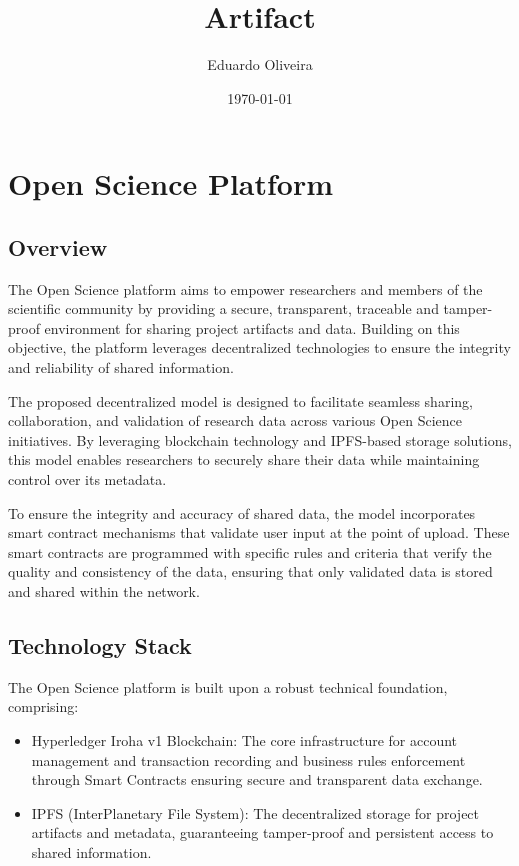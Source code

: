 \documentclass{article}
\title{Artifact}
\author{Eduardo Oliveira}
\date{\today}
\begin{document}
\maketitle

\section{Open Science Platform}

\subsection{Overview}

The Open Science platform aims to empower researchers and members of the scientific community by providing a secure, transparent, traceable and tamper-proof environment for sharing project artifacts and data. Building on this objective, the platform leverages decentralized technologies to ensure the integrity and reliability of shared information.

The proposed decentralized model is designed to facilitate seamless sharing, collaboration, and validation of research data across various Open Science initiatives. By leveraging blockchain technology and IPFS-based storage solutions, this model enables researchers to securely share their data while maintaining control over its metadata.

To ensure the integrity and accuracy of shared data, the model incorporates smart contract mechanisms that validate user input at the point of upload. These smart contracts are programmed with specific rules and criteria that verify the quality and consistency of the data, ensuring that only validated data is stored and shared within the network.




\subsection{Technology Stack}

The Open Science platform is built upon a robust technical foundation, comprising:

\begin{itemize}
      \item Hyperledger Iroha v1 Blockchain: The core infrastructure for account management and transaction recording and business rules enforcement through Smart Contracts ensuring secure and transparent data exchange.
      \item IPFS (InterPlanetary File System): The decentralized storage for project artifacts and metadata, guaranteeing tamper-proof and persistent access to shared information.
\end{itemize}
\end{document}
